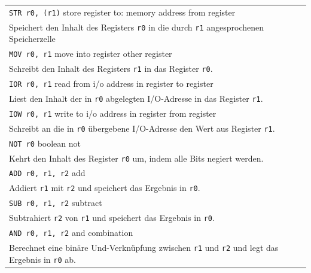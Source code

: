 {\begin{longtable}{|p{\textwidth}|}
        \hline
        \verb|STR r0, (r1)|
        \hfill {\footnotesize store register to: memory address from register}
        \\
        Speichert den Inhalt des Registers \texttt{r0} in die durch \texttt{r1}
        angesprochenen Speicherzelle
        \\

        \hline
        \verb|MOV r0, r1|
        \hfill {\footnotesize move into register other register}
        \\
        Schreibt den Inhalt des Registers \texttt{r1} in das Register \texttt{r0}.
        \\

        \hline
        \hline

        \hline
        \verb|IOR r0, r1|
        \hfill {\footnotesize read from i/o address in register to register}
        \\
        Liest den Inhalt der in \texttt{r0} abgelegten I/O-Adresse in das Register
        \texttt{r1}.
        \\

        \hline
        \verb|IOW r0, r1|
        \hfill {\footnotesize write to i/o address in register from register}
        \\
        Schreibt an die in \texttt{r0} übergebene I/O-Adresse den Wert aus Register
        \texttt{r1}.
        \\

        \hline
        \hline

        \hline
        \verb|NOT r0|
        \hfill {\footnotesize boolean not}
        \\
        Kehrt den Inhalt des Register \texttt{r0} um, indem alle Bits negiert werden.
        \\

        \hline
        \verb|ADD r0, r1, r2|
        \hfill {\footnotesize add}
        \\
        Addiert \texttt{r1} mit \texttt{r2} und speichert das Ergebnis in \texttt{r0}.
        \\

        \hline
        \verb|SUB r0, r1, r2|
        \hfill {\footnotesize subtract}
        \\
        Subtrahiert \texttt{r2} von \texttt{r1} und speichert das Ergebnis in \texttt{r0}.
        \\

        \hline
        \verb|AND r0, r1, r2|
        \hfill {\footnotesize and combination}
        \\
        Berechnet eine binäre Und-Verknüpfung zwischen \texttt{r1} und \texttt{r2}
        und legt das Ergebnis in \texttt{r0} ab.
        \\


\end{longtable}}
